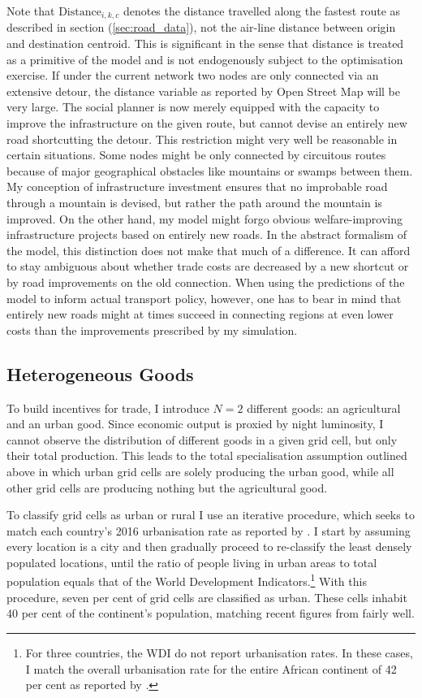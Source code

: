 \documentclass[11pt, oneside]{article}   	%
\let\oldref\ref
\renewcommand{\ref}[1]{(\oldref{#1})}
\begin{document}
Note that $\textrm{Distance}_{i,k,c}$ denotes the distance travelled along the fastest route as described in section \ref{sec:road_data}, not the air-line distance between origin and destination centroid. This is significant in the sense that distance is treated as a primitive of the model and is not endogenously subject to the optimisation exercise. If under the current network two nodes are only connected via an extensive detour, the distance variable as reported by Open Street Map will be very large. The social planner is now merely equipped with the capacity to improve the infrastructure on the given route, but cannot devise an entirely new road shortcutting the detour. This restriction might very well be reasonable in certain situations. Some nodes might be only connected by circuitous routes because of major geographical obstacles like mountains or swamps between them. My conception of infrastructure investment ensures that no improbable road through a mountain is devised, but rather the path around the mountain is improved. On the other hand, my model might forgo obvious welfare-improving infrastructure projects based on entirely new roads. In the abstract formalism of the model, this distinction does not make that much of a difference. It can afford to stay ambiguous about whether trade costs are decreased by a new shortcut or by road improvements on the old connection. When using the predictions of the model to  inform actual transport policy, however, one has to bear in mind that entirely new roads might at times succeed in connecting regions at even lower costs than the improvements prescribed by my simulation.

\subsection{Heterogeneous Goods}
To build incentives for trade, I introduce $N=2$ different goods: an agricultural and an urban good. Since economic output is proxied by night luminosity, I cannot observe the distribution of different goods in a given grid cell, but only their total production. This leads to the total specialisation assumption outlined above in which urban grid cells are solely producing the urban good, while all other grid cells are producing nothing but the agricultural good.

To classify grid cells as urban or rural I use an iterative procedure, which seeks to match each country's 2016 urbanisation rate as reported by \cite{the_world_bank_world_2017}. I start by assuming every location is a city and then gradually proceed to re-classify the least densely populated locations, until the ratio of people living in urban areas to total population equals that of the World Development Indicators.\footnote{For three countries, the WDI do not report urbanisation rates. In these cases, I match the overall urbanisation rate for the entire African continent of 42 per cent as reported by \cite{lall_africas_2017}.} With this procedure, seven per cent of grid cells are classified as urban. These cells inhabit 40 per cent of the continent's population, matching recent figures from \cite{lall_africas_2017} fairly well.
\end{document}
